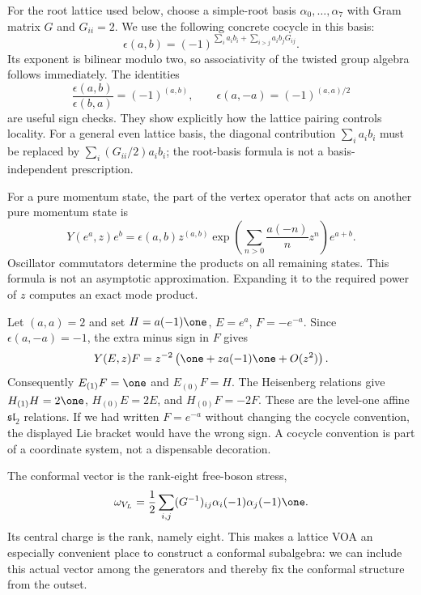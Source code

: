 For the root lattice used below, choose a simple-root basis
$\alpha_0,\ldots,\alpha_7$ with Gram matrix $G$ and $G_{ii}=2$.
We use the following concrete cocycle in this basis:
\begin{equation}\label{eq:c-lattice-cocycle}
 \epsilon(a,b)=(-1)^{\sum_i a_i b_i+
                           \sum_{i>j}a_i b_jG_{ij}}.
\end{equation}
Its exponent is bilinear modulo two, so associativity of the twisted
group algebra follows immediately. The identities
\[
 \frac{\epsilon(a,b)}{\epsilon(b,a)}=(-1)^{(a,b)},
 \qquad \epsilon(a,-a)=(-1)^{(a,a)/2}
\]
are useful sign checks. They show explicitly how the lattice pairing
controls locality. For a general even lattice basis, the diagonal
contribution $\sum_i a_i b_i$ must be replaced by
$\sum_i(G_{ii}/2)a_i b_i$; the root-basis formula is not a
basis-independent prescription.

For a pure momentum state, the part of the vertex operator that acts on
another pure momentum state is
\begin{equation}\label{eq:c-lattice-product}
 Y(e^a,z)e^b=\epsilon(a,b)z^{(a,b)}
 \exp\left(\sum_{n>0}\frac{a(-n)}n z^n\right)e^{a+b}.
\end{equation}
Oscillator commutators determine the products on all remaining states.
This formula is not an asymptotic approximation. Expanding it to the
required power of $z$ computes an exact mode product.

\begin{example}\label{ex:c-root-triple}
Let $(a,a)=2$ and set $H=a(-1)\one$, $E=e^a$, $F=-e^{-a}$.
Since $\epsilon(a,-a)=-1$, the extra minus sign in $F$ gives
\[
 Y(E,z)F=z^{-2}\left(\one+za(-1)\one+O(z^2)\right).
\]
Consequently $E_{(1)}F=\one$ and $E_{(0)}F=H$. The Heisenberg
relations give $H_{(1)}H=2\one$, $H_{(0)}E=2E$, and
$H_{(0)}F=-2F$. These are the level-one affine
$\mathfrak{sl}_2$ relations. If we had written $F=e^{-a}$ without
changing the cocycle convention, the displayed Lie bracket would have
the wrong sign. A cocycle convention is part of a coordinate system,
not a dispensable decoration.
\end{example}

The conformal vector is the rank-eight free-boson stress,
\[
 \omega_{V_L}=\frac12\sum_{i,j}(G^{-1})_{ij}
                       \alpha_i(-1)\alpha_j(-1)\one.
\]
Its central charge is the rank, namely eight. This makes a lattice VOA
an especially convenient place to construct a conformal subalgebra:
we can include this actual vector among the generators and thereby fix
the conformal structure from the outset.

